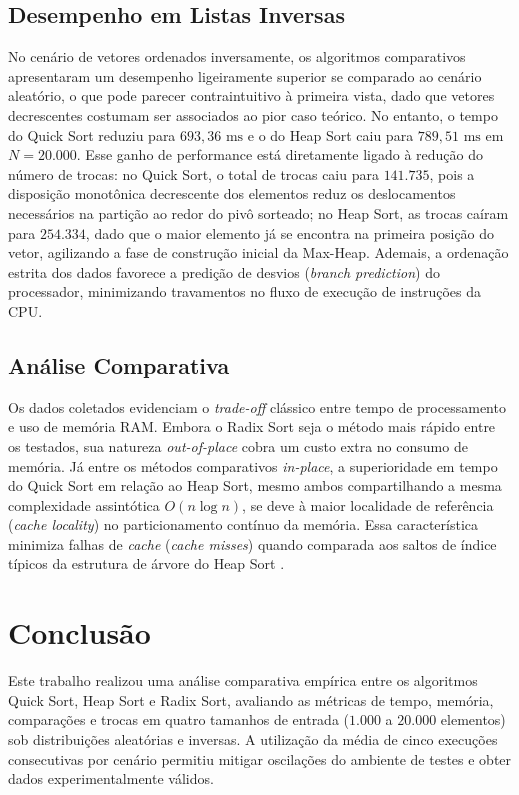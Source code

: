 \documentclass[12pt,a4paper]{article}
\begin{document}
\subsection{Desempenho em Listas Inversas}
No cenário de vetores ordenados inversamente, os algoritmos comparativos apresentaram um desempenho ligeiramente superior se comparado ao cenário aleatório, o que pode parecer contraintuitivo à primeira vista, dado que vetores decrescentes costumam ser associados ao pior caso teórico. No entanto, o tempo do Quick Sort reduziu para $693{,}36\text{ ms}$ e o do Heap Sort caiu para $789{,}51\text{ ms}$ em $N = 20.000$. Esse ganho de performance está diretamente ligado à redução do número de trocas: no Quick Sort, o total de trocas caiu para $141.735$, pois a disposição monotônica decrescente dos elementos reduz os deslocamentos necessários na partição ao redor do pivô sorteado; no Heap Sort, as trocas caíram para $254.334$, dado que o maior elemento já se encontra na primeira posição do vetor, agilizando a fase de construção inicial da Max-Heap. Ademais, a ordenação estrita dos dados favorece a predição de desvios (\textit{branch prediction}) do processador, minimizando travamentos no fluxo de execução de instruções da CPU.

\subsection{Análise Comparativa}
Os dados coletados evidenciam o \textit{trade-off} clássico entre tempo de processamento e uso de memória RAM. Embora o Radix Sort seja o método mais rápido entre os testados, sua natureza \textit{out-of-place} cobra um custo extra no consumo de memória. Já entre os métodos comparativos \textit{in-place}, a superioridade em tempo do Quick Sort em relação ao Heap Sort, mesmo ambos compartilhando a mesma complexidade assintótica $O(n \log n)$, se deve à maior localidade de referência (\textit{cache locality}) no particionamento contínuo da memória. Essa característica minimiza falhas de \textit{cache} (\textit{cache misses}) quando comparada aos saltos de índice típicos da estrutura de árvore do Heap Sort \cite{sedgewick2011}.

\section{Conclusão}
Este trabalho realizou uma análise comparativa empírica entre os algoritmos Quick Sort, Heap Sort e Radix Sort, avaliando as métricas de tempo, memória, comparações e trocas em quatro tamanhos de entrada ($1.000$ a $20.000$ elementos) sob distribuições aleatórias e inversas. A utilização da média de cinco execuções consecutivas por cenário permitiu mitigar oscilações do ambiente de testes e obter dados experimentalmente válidos.
\end{document}
